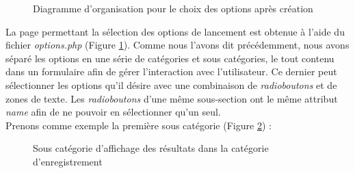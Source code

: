 \begin{figure}[!ht]
	\begin{center}
		\caption{Diagramme d'organisation pour le choix des options après création}
  		\label{DiagOptions}
  	\end{center}	
\end{figure}

La page permettant la sélection des options de lancement est obtenue à l'aide du fichier \emph{options.php} (Figure \ref{DiagOptions}). Comme nous l'avons dit précédemment, nous avons séparé les options en une série de catégories et sous catégories, le tout contenu dans un formulaire afin de gérer l'interaction avec l'utilisateur. Ce dernier peut sélectionner les options qu'il désire avec une combinaison de \textit{radioboutons} et de zones de texte. Les \textit{radioboutons} d'une même sous-section ont le même attribut \textit{name} afin de ne pouvoir en sélectionner qu'un seul. \\

Prenons comme exemple la première sous catégorie (Figure \ref{affichageResults}) :

\begin{figure}[!ht]
	\begin{center}
		\caption{Sous catégorie d'affichage des résultats dans la catégorie d'enregistrement}
  		\label{affichageResults}
  	\end{center}	
\end{figure}

